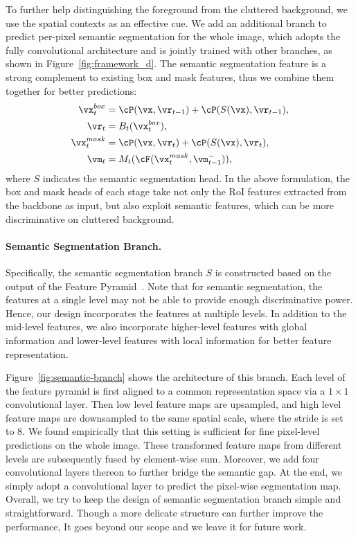\documentclass[10pt,twocolumn,letterpaper]{article}
\begin{document}
To further help distinguishing the foreground from the cluttered background,
we use the spatial contexts as an effective cue.
We add an additional branch to predict per-pixel semantic segmentation for
the whole image, which adopts the fully convolutional architecture and is
jointly trained with other branches, as shown in Figure~\ref{fig:framework_d}.
The semantic segmentation feature is a strong complement to existing
box and mask features, thus we combine them together for better predictions:
\begin{equation}
	\label{equ:framework_d}
	\begin{split}
		\vx_t^{box} &= \cP(\vx, \vr_{t-1}) + \cP(S(\vx), \vr_{t-1}), \\
		\vr_t &= B_t(\vx_t^{box}), \\
		\vx_t^{mask} &= \cP(\vx, \vr_t) + \cP(S(\vx), \vr_t), \\
		\vm_t &= M_t(\cF(\vx_t^{mask},\vm^-_{t-1})),
	\end{split}
\end{equation}
where $S$ indicates the semantic segmentation head.
In the above formulation, the box and mask heads of each stage take
not only the RoI features extracted from the backbone as input, but also
exploit semantic features, which can be more discriminative on cluttered
background.

\vspace{-7pt}
\paragraph{Semantic Segmentation Branch.}
Specifically, the semantic segmentation branch $S$ is constructed
based on the output of the Feature Pyramid~\cite{lin2017feature}.
Note that for semantic segmentation, the features at a single level
may not be able to provide enough discriminative power. Hence,
our design incorporates the features at multiple levels.
In addition to the mid-level features, we also incorporate higher-level
features with global information and lower-level features with local information
for better feature representation.



Figure~\ref{fig:semantic-branch} shows the architecture of this branch.
Each level of the feature pyramid is first aligned to a common representation
space via a $1\times 1$ convolutional layer.
Then low level feature maps are upsampled, and high level feature maps are
downsampled to the same spatial scale, where the stride is set to $8$.
We found empirically that this setting is sufficient for fine pixel-level
predictions on the whole image.
These transformed feature maps from different levels are subsequently fused
by element-wise sum.
Moreover, we add four convolutional layers thereon to further bridge the
semantic gap.
At the end, we simply adopt a convolutional layer to predict the pixel-wise
segmentation map.
Overall, we try to keep the design of semantic segmentation branch simple
and straightforward.
Though a more delicate structure can further improve the performance,
It goes beyond our scope and we leave it for future work.
\end{document}
